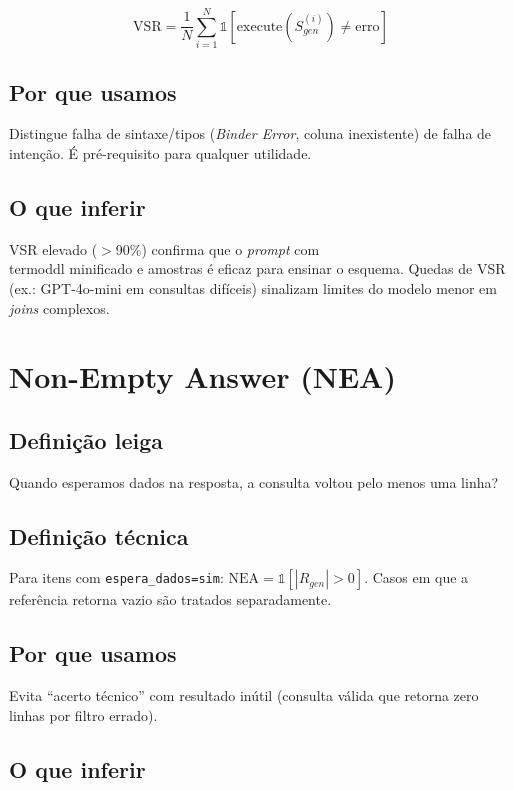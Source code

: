 \[
\text{VSR} = \frac{1}{N} \sum_{i=1}^{N} \mathbb{1}\left[ \text{execute}(S_{gen}^{(i)}) \neq \text{erro} \right]
\]

\subsection{Por que usamos}

Distingue falha de sintaxe/tipos (\textit{Binder Error}, coluna inexistente) de falha de intenção. É pré-requisito para qualquer utilidade.

\subsection{O que inferir}

VSR elevado ($>$90\%) confirma que o \textit{prompt} com \\termo{ddl} minificado e amostras é eficaz para ensinar o esquema. Quedas de VSR (ex.: GPT-4o-mini em consultas difíceis) sinalizam limites do modelo menor em \textit{joins} complexos.

\section{Non-Empty Answer (NEA)}

\subsection{Definição leiga}

Quando esperamos dados na resposta, a consulta voltou pelo menos uma linha?

\subsection{Definição técnica}

Para itens com \texttt{espera\_dados=sim}: $\text{NEA} = \mathbb{1}[|R_{gen}| > 0]$. Casos em que a referência retorna vazio são tratados separadamente.

\subsection{Por que usamos}

Evita ``acerto técnico'' com resultado inútil (consulta válida que retorna zero linhas por filtro errado).

\subsection{O que inferir}

